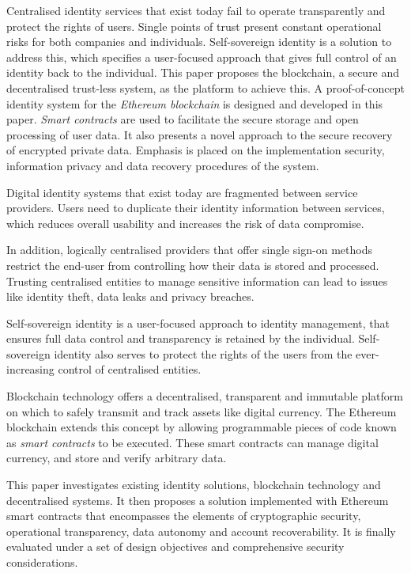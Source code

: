 \documentclass[a4paper, 12pt, oneside]{report}
\begin{document}
\thesistitlepage
\thesisdeclarationpage

\begin{thesisabstract}
Centralised identity services that exist today fail to operate transparently and protect the rights of users. Single points of trust present constant operational risks for both companies and individuals. Self-sovereign identity is a solution to address this, which specifies a user-focused approach that gives full control of an identity back to the individual. This paper proposes the blockchain, a secure and decentralised trust-less system, as the platform to achieve this. A proof-of-concept identity system for the \textit{Ethereum blockchain} is designed and developed in this paper. \textit{Smart contracts} are used to facilitate the secure storage and open processing of user data. It also presents a novel approach to the secure recovery of encrypted private data. Emphasis is placed on the implementation security, information privacy and data recovery procedures of the system. 
\end{thesisabstract}

\begin{thesissummary}
Digital identity systems that exist today are fragmented between service providers. Users need to duplicate their identity information between services, which reduces overall usability and increases the risk of data compromise. 

In addition, logically centralised providers that offer single sign-on methods restrict the end-user from controlling how their data is stored and processed. Trusting centralised entities to manage sensitive information can lead to issues like identity theft, data leaks and privacy breaches. 

Self-sovereign identity is a user-focused approach to identity management, that ensures full data control and transparency is retained by the individual. Self-sovereign identity also serves to protect the rights of  the users from the ever-increasing control of centralised entities.

Blockchain technology offers a decentralised, transparent and immutable platform on which to safely transmit and track assets like digital currency. The Ethereum blockchain extends this concept by allowing programmable pieces of code known as \textit{smart contracts} to be executed. These smart contracts can manage digital currency, and store and verify arbitrary data.

This paper investigates existing identity solutions, blockchain technology and decentralised systems. It then proposes a solution implemented with Ethereum smart contracts that encompasses the elements of cryptographic security, operational transparency, data autonomy and account recoverability. It is finally evaluated under a set of design objectives and comprehensive security considerations.

\end{thesissummary}
\end{document}
